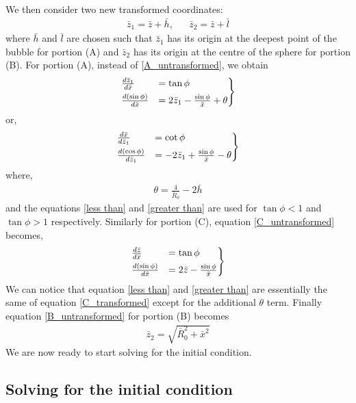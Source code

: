 We then consider two new transformed coordinates:
\begin{align}
    \bar{z}_1 = \bar{z}+\bar{h}, && \bar{z}_2=\bar{z}+\bar{l}
\end{align}
where $\bar{h}$ and $\bar{l}$ are chosen such that $\bar{z}_1$ has its origin at the deepest point of the bubble for portion (A) and $\bar{z}_2$ has its origin at the centre of the sphere for portion (B). For portion (A), instead of \ref{A_untransformed}, we obtain
\begin{align}\label{less than}
\begin{rcases}   
    \frac{d\bar{z}_1}{d\bar{x}} &= \tan \phi \\
    \frac{d(\sin\phi)}{d\bar{x}} &= 2\bar{z}_1 - \frac{\sin\phi}{\bar{x}} + \theta
\end{rcases} 
\end{align}
or,
\begin{align}\label{greater than}
\begin{rcases}
    \frac{d\bar{x}}{d\bar{z}_1} &= \cot \phi \\
    \frac{d(\cos\phi)}{d\bar{z}_1} &= -2\bar{z}_1 + \frac{\sin\phi}{\bar{x}} - \theta
\end{rcases}
\end{align}
where,
\begin{align}
    \theta = \frac{4}{\bar{R}_0} - 2\bar{h}
\end{align}
and the equations \ref{less than} and \ref{greater than} are used for $\tan\phi <1$ and $\tan\phi >1$ respectively. Similarly for portion (C), equation \ref{C_untransformed} becomes,
\begin{align}\label{C_transformed}
\begin{rcases}   
    \frac{d\bar{z}}{d\bar{x}} &= \tan \phi \\
    \frac{d(\sin\phi)}{d\bar{x}} &= 2\bar{z} - \frac{\sin\phi}{\bar{x}}
\end{rcases} 
\end{align}
We can notice that equation \ref{less than} and \ref{greater than} are essentially the same of equation \ref{C_transformed} except for the additional $\theta$ term. Finally equation \ref{B_untransformed} for portion (B) becomes
\begin{align}\label{Eq_B}
    \bar{z}_2 = \sqrt{ \bar{R}_0^2+\bar{x}^2}
\end{align}
We are now ready to start solving for the initial condition.

\subsection{Solving for the initial condition}

